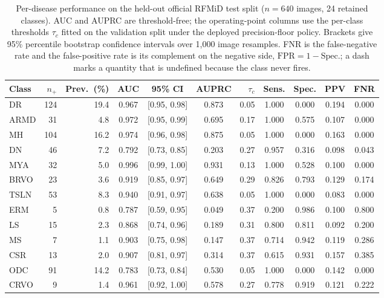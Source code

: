 \begin{table}[!t]
\centering
\caption{Per-disease performance on the held-out official RFMiD test split ($n{=}640$ images,
24 retained classes). AUC and AUPRC are threshold-free; the operating-point columns use the
per-class thresholds $\tau_c$ fitted on the validation split under the deployed precision-floor
policy. Brackets give 95\% percentile bootstrap confidence intervals over 1{,}000 image
resamples. FNR is the false-negative rate and the false-positive rate is its complement on the
negative side, $\mathrm{FPR} = 1 - \mathrm{Spec.}$; a dash marks a quantity that is undefined
because the class never fires.}
\label{tab:perdisease}
\scriptsize
\setlength{\tabcolsep}{4pt}
\begin{tabular}{lrrcccrcccc}
\toprule
Class & $n_+$ & Prev.\ (\%) & AUC & 95\% CI & AUPRC & $\tau_c$ & Sens. & Spec. & PPV & FNR \\
\midrule
DR & 124 & 19.4 & 0.967 & [0.95, 0.98] & 0.873 & 0.05 & 1.000 & 0.000 & 0.194 & 0.000 \\
ARMD & 31 & 4.8 & 0.972 & [0.95, 0.99] & 0.695 & 0.17 & 1.000 & 0.575 & 0.107 & 0.000 \\
MH & 104 & 16.2 & 0.974 & [0.96, 0.98] & 0.875 & 0.05 & 1.000 & 0.000 & 0.163 & 0.000 \\
DN & 46 & 7.2 & 0.792 & [0.73, 0.85] & 0.203 & 0.27 & 0.957 & 0.316 & 0.098 & 0.043 \\
MYA & 32 & 5.0 & 0.996 & [0.99, 1.00] & 0.931 & 0.13 & 1.000 & 0.528 & 0.100 & 0.000 \\
BRVO & 23 & 3.6 & 0.919 & [0.85, 0.97] & 0.649 & 0.29 & 0.826 & 0.793 & 0.129 & 0.174 \\
TSLN & 53 & 8.3 & 0.940 & [0.91, 0.97] & 0.638 & 0.05 & 1.000 & 0.000 & 0.083 & 0.000 \\
ERM & 5 & 0.8 & 0.787 & [0.59, 0.95] & 0.049 & 0.37 & 0.200 & 0.986 & 0.100 & 0.800 \\
LS & 15 & 2.3 & 0.868 & [0.74, 0.96] & 0.189 & 0.31 & 0.800 & 0.811 & 0.092 & 0.200 \\
MS & 7 & 1.1 & 0.903 & [0.75, 0.98] & 0.147 & 0.37 & 0.714 & 0.942 & 0.119 & 0.286 \\
CSR & 13 & 2.0 & 0.907 & [0.81, 0.97] & 0.314 & 0.37 & 0.615 & 0.931 & 0.157 & 0.385 \\
ODC & 91 & 14.2 & 0.783 & [0.73, 0.84] & 0.530 & 0.05 & 1.000 & 0.000 & 0.142 & 0.000 \\
CRVO & 9 & 1.4 & 0.961 & [0.92, 1.00] & 0.578 & 0.27 & 0.778 & 0.919 & 0.121 & 0.222 \\

\end{tabular}
\end{table}
